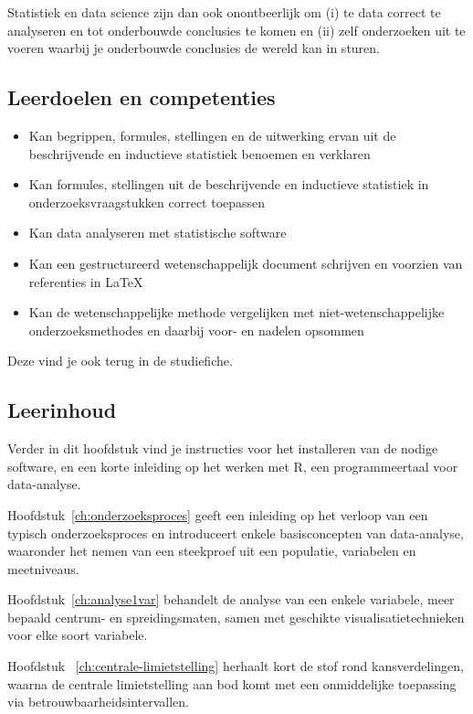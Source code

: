 Statistiek  en data science zijn dan ook onontbeerlijk om (i) te data correct te analyseren en tot onderbouwde conclusies te komen en (ii) zelf onderzoeken uit te voeren waarbij je onderbouwde conclusies de wereld kan in sturen. 

\subsection{Leerdoelen en competenties}

\begin{itemize}
  \item Kan begrippen, formules, stellingen en de uitwerking ervan uit de beschrijvende en inductieve statistiek benoemen en verklaren
  \item Kan formules, stellingen uit de beschrijvende en inductieve statistiek in onderzoeksvraagstukken correct toepassen
  \item Kan data analyseren met statistische software
  \item Kan een gestructureerd wetenschappelijk document schrijven en voorzien van referenties in \LaTeX{}
  \item Kan de wetenschappelijke methode vergelijken met niet-wetenschappelijke onderzoeksmethodes en daarbij voor- en nadelen opsommen 
\end{itemize}

Deze vind je ook terug in de studiefiche.

\subsection{Leerinhoud}

Verder in dit hoofdstuk vind je instructies voor het installeren van de nodige software, en een korte inleiding op het werken met R, een programmeertaal voor data-analyse.

Hoofdstuk~\ref{ch:onderzoeksproces} geeft een inleiding op het verloop van een typisch onderzoeksproces en introduceert enkele basisconcepten van data-analyse, waaronder het nemen van een steekproef uit een populatie, variabelen en meetniveaus.

Hoofdstuk~\ref{ch:analyse1var} behandelt de analyse van een enkele variabele, meer bepaald centrum- en spreidingsmaten, samen met geschikte visualisatietechnieken voor elke soort variabele.

Hoofdstuk ~\ref{ch:centrale-limietstelling} herhaalt kort de stof rond kansverdelingen, waarna de centrale limietstelling aan bod komt met een onmiddelijke toepassing via betrouwbaarheidsintervallen. 

